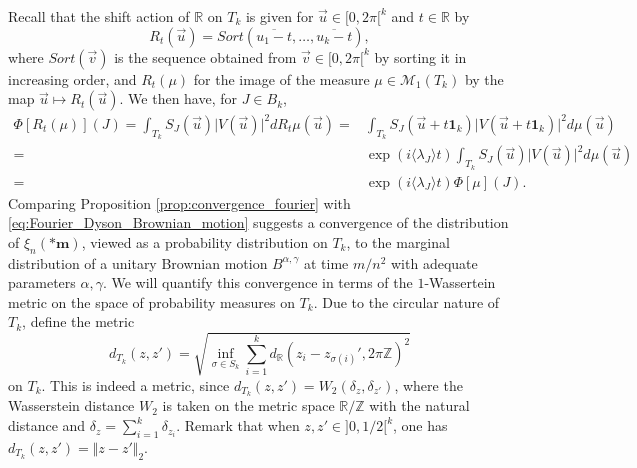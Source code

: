 \documentclass[10pt,11pt]{amsart}%
\begin{document}
Recall that the shift action of $\mathbb{R}$ on $T_k$ is given for $\vec{u}\in [0,2\pi[^k$ and $t\in \mathbb{R}$ by 
$$R_t( \vec{u})=Sort(\overline{u_1-t},\ldots,\overline{u_k-t}),$$ where $Sort(\vec{v})$ is the sequence obtained from $\vec{v}\in [0,2\pi[^k$ by sorting it in increasing order, and $R_t( \mu)$ for the image of the measure $\mu\in \mathcal{M}_1( T_{k})$ by the map $\vec{u}\mapsto R_t(\vec{u})$. We then have, for $J\in B_{k}$,
\begin{align}
\Phi[R_t(\mu)](J)=\int_{ T_{k}}S_{J}(\vec{u})\vert V(\vec{u})\vert^2dR_t\mu(\vec{u})=&\int_{ T_{k}}S_{J}(\vec{u}+t\mathbf{1}_{k})\vert V(\vec{u}+t\mathbf{1}_{k})\vert^2d\mu(\vec{u})\nonumber\\
=&\exp(i\langle \lambda_J\rangle t)\int_{ T_{k}}S_{J}(\vec{u})\vert V(\vec{u})\vert^2d\mu(\vec{u})\nonumber\\
=&\exp(i\langle \lambda_J\rangle t)\Phi[\mu](J).\label{eq:effect_rotation_Fourier}
\end{align}
Comparing Proposition \ref{prop:convergence_fourier} with \eqref{eq:Fourier_Dyson_Brownian_motion} suggests a convergence of the distribution of $\xi_n(*\mathbf{m})$, viewed as a probability distribution on $ T_{k}$, to the marginal distribution of a unitary Brownian motion $B^{\alpha,\gamma}$ at time $m/n^2$ with adequate parameters $\alpha,\gamma$. We will quantify this convergence in terms of the $1$-Wassertein metric on the space of probability measures on $ T_{k}$. Due to the circular nature of $ T_{k}$, define the metric
$$d_{ T_{k}}(z,z')=\sqrt{\inf_{\sigma\in S_k}\sum_{i=1}^kd_{\mathbb{R}}(z_{i}-z_{\sigma(i)}',2\pi\mathbb{Z})^2}$$
on $ T_{k}$. This is indeed a metric, since $d_{ T_{k}}(z,z')=W_2(\delta_{z},\delta_{z'})$, where the Wasserstein distance $W_2$ is taken on the metric space $\mathbb{R}/\mathbb{Z}$ with the natural distance and $\delta_{z}=\sum_{i=1}^k\delta_{z_i}$. Remark that when $z,z'\in ]0,1/2[^k$, one has $d_{ T_{k}}(z,z')=\Vert z-z'\Vert_2$.
\end{document}
